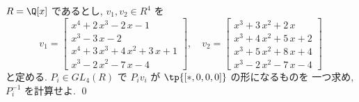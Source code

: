 \documentclass[12pt,twoside]{jarticle}
\begin{document}

\begin{question}
\label{q:Euclid-v-2}
  $R=\Q[x]$ であるとし, $v_1,v_2\in R^4$ を
  \begin{equation*}
    v_1 =
    \left[ 
      \begin{array}{c}
        {x}^{4} + 2\,{x}^{3} - 2\,{x} - 1 \\
        {x}^{3} - 3\,{x} - 2 \\
        {x}^{4} + 3\,{x}^{3} + 4\,{x}^{2} + 3\,{x} + 1 \\
        {x}^{3} - 2\,{x}^{2} - 7\,{x} - 4
      \end{array}
    \right],
    \quad
    v_2 =
    \left[ 
      \begin{array}{c}
        {x}^{3} + 3\,{x}^{2} + 2\,{x} \\
        {x}^{3} + 4\,{x}^{2} + 5\,{x} + 2 \\
        {x}^{3} + 5\,{x}^{2} + 8\,{x} + 4 \\
        {x}^{3} - 2\,{x}^{2} - 7\,{x} - 4
      \end{array}
    \right]
  \end{equation*}
  と定める.
  $P_i\in GL_4(R)$ で $P_iv_i$ が $\tp{[*,0,0,0]}$ の形になるものを
  一つ求め, $P_i^{-1}$ を計算せよ. \qed
\end{question}
\end{document}
